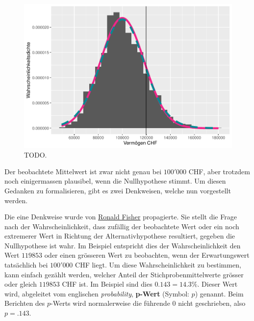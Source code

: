 \documentclass[
]{book}
\theoremstyle{definition}
\theoremstyle{definition}
\theoremstyle{definition}
\theoremstyle{definition}
\theoremstyle{remark}
\begin{document}
\begin{figure}
\centering
\includegraphics{aps_statistik1_files/figure-latex/exm-vermoegen-histogram-plot-1.pdf}
\caption{\label{fig:exm-vermoegen-histogram-plot}TODO.}
\end{figure}

Der beobachtete Mittelwert ist zwar nicht genau bei \(100'000\) CHF, aber trotzdem noch einigermassen plausibel, wenn die Nullhypothese stimmt. Um diesen Gedanken zu formalisieren, gibt es zwei Denkweisen, welche nun vorgestellt werden.

Die eine Denkweise wurde von \href{https://en.wikipedia.org/wiki/Ronald_Fisher}{Ronald Fisher} propagierte. Sie stellt die Frage nach der Wahrscheinlichkeit, dass zufällig der beobachtete Wert oder ein noch extremerer Wert in Richtung der Alternativhypothese resultiert, gegeben die Nullhypothese ist wahr. Im Beispiel entspricht dies der Wahrscheinlichkeit den Wert \(119853\) oder einen grösseren Wert zu beobachten, wenn der Erwartungswert tatsächlich bei \(100'000\) CHF liegt. Um diese Wahrscheinlichkeit zu bestimmen, kann einfach gezählt werden, welcher Anteil der Stichprobenmittelwerte grösser oder gleich \(119853\) CHF ist. Im Beispiel sind dies \(0.143 = 14.3\%\). \label{customdef-pwert}{Dieser Wert wird, abgeleitet vom englischen \emph{probability}, \textbf{p-Wert} (Symbol: \(p\)) genannt. Beim Berichten des \(p\)-Werts wird normalerweise die führende \(0\) nicht geschrieben, also \(p = .143\).}
\end{document}
